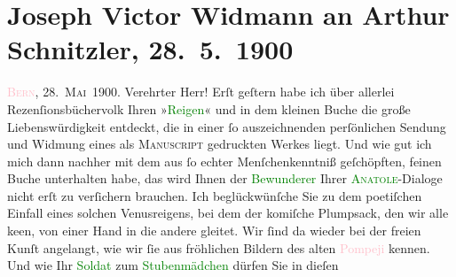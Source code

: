 

               \section[Joseph Victor Widmann an Arthur Schnitzler, 28. 5. 1900]{ Joseph Victor Widmann an Arthur Schnitzler, 28. 5. 1900}\nopagebreak{}\rehead{ }\normalsize\beginnumbering{} \toendnotes[C]{\smallbreak\pagebreak[2]} 
\toendnotes[C]{\smallbreak}\pstart
           \raggedleft{}{\pb}\textsc{\textcolor{pink}{Bern}{}\ledrightnote{\textcolor{pink}{Bern}}, 28. Mai 1900}.\pend
           \pstart{}Verehrter Herr!\pend\pstart
           Erſt geſtern habe ich über allerlei Rezenſionsbüchervolk Ihren »\textcolor{green}{Reigen}{}\ledrightnote{\textcolor{green}{Reigen. Zehn Dialoge}}« und in dem kleinen Buche die große
                    Liebenswürdigkeit entdeckt, die in einer ſo auszeichnenden perſönlichen {\pb}Sendung und Widmung eines als \textsc{Manuscript} gedruckten Werkes liegt.\pend
           \pstart
           Und wie gut ich mich dann nachher mit dem aus ſo echter Menſchenkenntniß
                    geſchöpften, feinen Buche unterhalten habe, das wird Ihnen der \textcolor{green}{Bewunderer}{} Ihrer \textsc{\textcolor{green}{Anatole}{}\ledrightnote{\textcolor{green}{Anatol}}}-Dialoge nicht erſt zu verſichern brauchen.\pend
           \pstart
           Ich beglückwünſche Sie zu dem poetiſchen Einfall eines solchen Venusreigens, bei
                    dem der komiſche Plumpsack, den wir alle ke{\geminationn}en, von
                    einer Hand in die andere gleitet. Wir ſind da wieder bei der freien Kunſt
                    angelangt, wie wir ſie aus fröhlichen Bildern des alten \textcolor{pink}{Pompeji}{}\ledrightnote{\textcolor{pink}{Pompei}} kennen. Und wie Ihr \textcolor{green}{Soldat}{} zum \textcolor{green}{Stubenmädchen}{} dürfen Sie in dieſen
